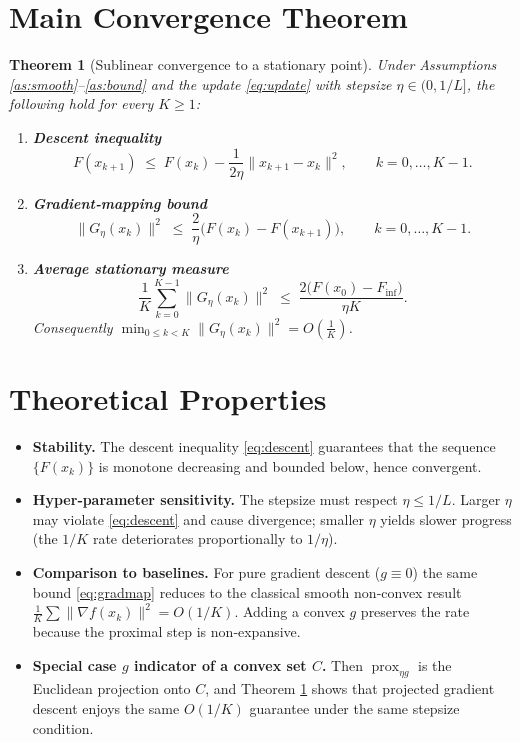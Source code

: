 \documentclass[11pt]{article}
\newtheorem{theorem}{Theorem}
\begin{document}
\section*{Main Convergence Theorem}
\begin{theorem}[Sublinear convergence to a stationary point]\label{thm:main}
Under Assumptions \ref{as:smooth}–\ref{as:bound} and the update \eqref{eq:update} with stepsize $\eta\in(0,1/L]$, the following hold for every $K\ge1$:
\begin{enumerate}
\item \textbf{Descent inequality}
\begin{equation}
F(x_{k+1})\;\le\;F(x_{k})-\frac{1}{2\eta}\|x_{k+1}-x_{k}\|^{2},\qquad k=0,\dots,K-1.
\label{eq:descent}
\end{equation}
\item \textbf{Gradient‑mapping bound}
\begin{equation}
\|G_{\eta}(x_{k})\|^{2}\;\le\;\frac{2}{\eta}\bigl(F(x_{k})-F(x_{k+1})\bigr),\qquad k=0,\dots,K-1.
\label{eq:gradmap}
\end{equation}
\item \textbf{Average stationary measure}
\[
\frac{1}{K}\sum_{k=0}^{K-1}\|G_{\eta}(x_{k})\|^{2}\;\le\;\frac{2\bigl(F(x_{0})-F_{\inf}\bigr)}{\eta K}.
\]
Consequently $\displaystyle\min_{0\le k<K}\|G_{\eta}(x_{k})\|^{2}=O\!\left(\frac{1}{K}\right)$.
\end{enumerate}
\end{theorem}

\section*{Theoretical Properties}
\begin{itemize}
\item \textbf{Stability.} The descent inequality \eqref{eq:descent} guarantees that the sequence $\{F(x_{k})\}$ is monotone decreasing and bounded below, hence convergent.
\item \textbf{Hyper‑parameter sensitivity.} The stepsize must respect $\eta\le 1/L$. Larger $\eta$ may violate \eqref{eq:descent} and cause divergence; smaller $\eta$ yields slower progress (the $1/K$ rate deteriorates proportionally to $1/\eta$).
\item \textbf{Comparison to baselines.} For pure gradient descent ($g\equiv0$) the same bound \eqref{eq:gradmap} reduces to the classical smooth non‑convex result $\frac{1}{K}\sum\|\nabla f(x_{k})\|^{2}=O(1/K)$. Adding a convex $g$ preserves the rate because the proximal step is non‑expansive.
\item \textbf{Special case $g$ indicator of a convex set $C$.} Then $\operatorname{prox}_{\eta g}$ is the Euclidean projection onto $C$, and Theorem \ref{thm:main} shows that projected gradient descent enjoys the same $O(1/K)$ guarantee under the same stepsize condition.
\end{itemize}
\end{document}
